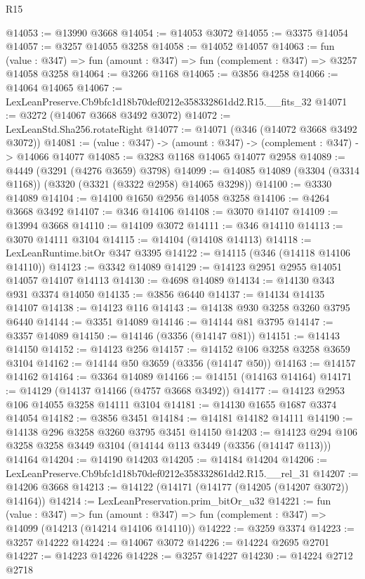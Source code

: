 \begin{lexlean}{R15}
\begin{coremodule}
@14053 := @13990 @3668
@14054 := @14053 @3072
@14055 := @3375 @14054
@14057 := @3257 @14055 @3258
@14058 := @14052 @14057
@14063 := fun (value : @347) => fun (amount : @347) => fun (complement : @347) => @3257 @14058 @3258
@14064 := @3266 @1168
@14065 := @3856 @4258
@14066 := @14064 @14065
@14067 := LexLeanPreserve.Cb9bfc1d18b70def0212e358332861dd2.R15.__fits_32
@14071 := @3272 (@14067 @3668 @3492 @3072)
@14072 := LexLeanStd.Sha256.rotateRight
@14077 := @14071 (@346 (@14072 @3668 @3492 @3072))
@14081 := (value : @347) -> (amount : @347) -> (complement : @347) -> @14066 @14077
@14085 := @3283 @1168 @14065 @14077 @2958
@14089 := @4449 (@3291 (@4276 @3659) @3798)
@14099 := @14085 @14089 (@3304 (@3314 @1168)) (@3320 (@3321 (@3322 @2958) @14065 @3298))
@14100 := @3330 @14089
@14104 := @14100 @1650 @2956 @14058 @3258
@14106 := @4264 @3668 @3492
@14107 := @346 @14106
@14108 := @3070 @14107
@14109 := @13994 @3668
@14110 := @14109 @3072
@14111 := @346 @14110
@14113 := @3070 @14111 @3104
@14115 := @14104 (@14108 @14113)
@14118 := LexLeanRuntime.bitOr @347 @3395
@14122 := @14115 (@346 (@14118 @14106 @14110))
@14123 := @3342 @14089
@14129 := @14123 @2951 @2955 @14051 @14057 @14107 @14113
@14130 := @4698 @14089
@14134 := @14130 @343 @931 @3374 @14050
@14135 := @3856 @6440
@14137 := @14134 @14135 @14107
@14138 := @14123 @116
@14143 := @14138 @930 @3258 @3260 @3795 @6440
@14144 := @3351 @14089
@14146 := @14144 @81 @3795
@14147 := @3357 @14089
@14150 := @14146 (@3356 (@14147 @81))
@14151 := @14143 @14150
@14152 := @14123 @256
@14157 := @14152 @106 @3258 @3258 @3659 @3104
@14162 := @14144 @50 @3659 (@3356 (@14147 @50))
@14163 := @14157 @14162
@14164 := @3364 @14089
@14166 := @14151 (@14163 @14164)
@14171 := @14129 (@14137 @14166 (@4757 @3668 @3492))
@14177 := @14123 @2953 @106 @14055 @3258 @14111 @3104
@14181 := @14130 @1655 @1687 @3374 @14054
@14182 := @3856 @3451
@14184 := @14181 @14182 @14111
@14190 := @14138 @296 @3258 @3260 @3795 @3451 @14150
@14203 := @14123 @294 @106 @3258 @3258 @3449 @3104 (@14144 @113 @3449 (@3356 (@14147 @113))) @14164
@14204 := @14190 @14203
@14205 := @14184 @14204
@14206 := LexLeanPreserve.Cb9bfc1d18b70def0212e358332861dd2.R15.__rel_31
@14207 := @14206 @3668
@14213 := @14122 (@14171 (@14177 (@14205 (@14207 @3072)) @14164))
@14214 := LexLeanPreservation.prim_bitOr_u32
@14221 := fun (value : @347) =>
  fun (amount : @347) => fun (complement : @347) => @14099 (@14213 (@14214 @14106 @14110))
@14222 := @3259 @3374
@14223 := @3257 @14222
@14224 := @14067 @3072
@14226 := @14224 @2695 @2701
@14227 := @14223 @14226
@14228 := @3257 @14227
@14230 := @14224 @2712 @2718

\end{coremodule}
\end{lexlean}
